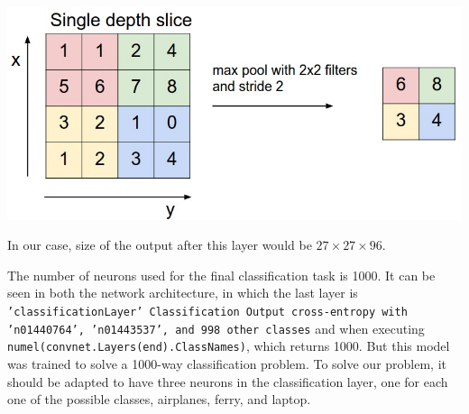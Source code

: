 \documentclass[10pt]{article}
\begin{document}
\begin{multicols}{2}
     \begin{center}
       \includegraphics[width=\linewidth]{img/maxpool}
     \end{center}

      In our case, size of the output after this layer would be $27 \times 27 \times 96$.
     

    The number of neurons used for the final classification task is 1000. It can be seen
    in both the network architecture, in which the last layer is \texttt{'classificationLayer'
      Classification Output         cross-entropy with 'n01440764', 'n01443537', and 998 other classes}
    and when executing \texttt{numel(convnet.Layers(end).ClassNames)}, which returns 1000.
    But this model was trained to solve a 1000-way classification problem. To solve our
    problem, it should be adapted to have three neurons in the classification layer, one for each
    one of the possible classes, airplanes, ferry, and laptop.

\end{multicols}
\end{document}
